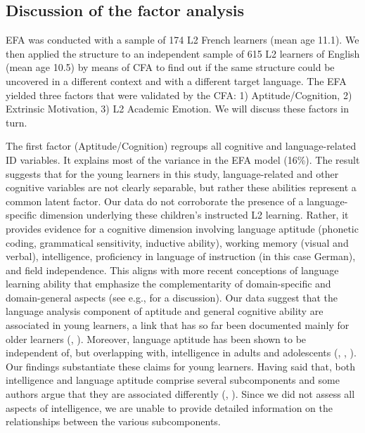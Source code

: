 \documentclass[output=paper]{langsci/langscibook}
\begin{document}
\subsection{Discussion of the factor analysis}\label{sec:03:3.3}

EFA was conducted with a sample of 174 L2 French learners (mean age 11.1). We then applied the structure to an independent sample of 615 L2 learners of English (mean age 10.5) by means of CFA to find out if the same structure could be uncovered in a different context and with a different target language. The EFA yielded three factors that were validated by the CFA: 1) Aptitude/Cognition, 2) Extrinsic Motivation, 3) L2 Academic Emotion. We will discuss these factors in turn.

The first factor (Aptitude/Cognition) regroups all cognitive and language-re\-lat\-ed ID variables. It explains most of the variance in the EFA model (16\%). The result suggests that for the young learners in this study, language-re\-lat\-ed and other cognitive variables are not clearly separable, but rather these abilities represent a common latent factor. Our data do not corroborate the presence of a language-specific dimension underlying these children’s instructed L2 learning. Rather, it provides evidence for a cognitive dimension involving language aptitude (phonetic coding, grammatical sensitivity, inductive ability), working memory (visual and verbal), intelligence, proficiency in language of instruction (in this case German), and field independence. This aligns with more recent conceptions of language learning ability that emphasize the complementarity of domain-specific and domain-general aspects (see e.g., \citealt{Skehan2019} for a discussion). Our data suggest that the language analysis component of aptitude and general cognitive ability are associated in young learners, a link that has so far been documented mainly for older learners (\citealt{Granena2012,Granena2012}, \citealt{Sasaki1996}). Moreover, language aptitude has been shown to be independent of, but overlapping with, intelligence in adults and adolescents (\citealt{WescheEtAl1982}, \citealt{Sasaki1996}, \citealt[827]{Li2016}). Our findings substantiate these claims for young learners. Having said that, both intelligence and language aptitude comprise several subcomponents and some authors argue that they are associated differently (\citealt{Granena2013}, \citealt{Li2016}). Since we did not assess all aspects of intelligence, we are unable to provide detailed information on the relationships between the various subcomponents.
\end{document}
